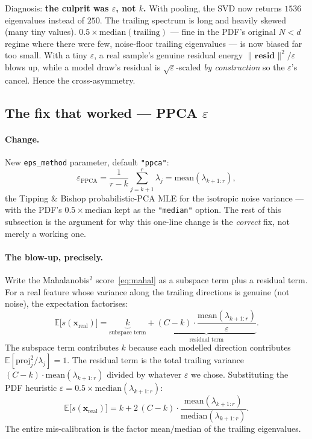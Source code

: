 \documentclass[11pt]{article}
\newcommand{\code}[1]{\texttt{#1}}
\begin{document}
Diagnosis: \textbf{the culprit was $\varepsilon$, not $k$.} With pooling, the SVD
now returns $1536$ eigenvalues instead of $250$. The trailing spectrum is long and
heavily skewed (many tiny values). $0.5 \times \mathrm{median}(\text{trailing})$
--- fine in the PDF's original $N < d$ regime where there were few, noise-floor
trailing eigenvalues --- is now biased far too small. With a tiny $\varepsilon$, a
real sample's genuine residual energy $\lVert\mathbf{resid}\rVert^2 / \varepsilon$
blows up, while a model draw's residual is $\sqrt{\varepsilon}$-scaled \emph{by
construction} so the $\varepsilon$'s cancel. Hence the cross-asymmetry.

\subsection{The fix that worked --- PPCA $\varepsilon$}
\label{sec:ppca}

\paragraph{Change.}
New \code{eps\_method} parameter, default \code{"ppca"}:
\begin{equation}
  \varepsilon_{\text{PPCA}} = \frac{1}{r-k}\sum_{j=k+1}^{r} \lambda_j
  = \mathrm{mean}(\lambda_{k+1:r}),
  \label{eq:ppca}
\end{equation}
the Tipping \& Bishop probabilistic-PCA MLE for the isotropic noise variance ---
with the PDF's $0.5 \times \mathrm{median}$ kept as the \code{"median"} option.
The rest of this subsection is the argument for why this one-line change is the
\emph{correct} fix, not merely a working one.

\paragraph{The blow-up, precisely.}
Write the Mahalanobis$^2$ score~\eqref{eq:mahal} as a subspace term plus a
residual term. For a real feature whose variance along the trailing directions is
genuine (not noise), the expectation factorises:
\begin{equation}
  \mathbb{E}\bigl[s(\mathbf{x}_{\text{real}})\bigr]
    = \underbrace{k}_{\text{subspace term}}
    + \underbrace{(C-k)\cdot
        \frac{\mathrm{mean}(\lambda_{k+1:r})}{\varepsilon}}_{\text{residual term}}.
  \label{eq:blowup}
\end{equation}
The subspace term contributes $k$ because each modelled direction contributes
$\mathbb{E}[\mathrm{proj}_j^2/\lambda_j] = 1$. The residual term is the total
trailing variance $(C-k)\cdot\mathrm{mean}(\lambda_{k+1:r})$ divided by whatever
$\varepsilon$ we chose. Substituting the PDF heuristic
$\varepsilon = 0.5 \times \mathrm{median}(\lambda_{k+1:r})$:
\begin{equation}
  \mathbb{E}\bigl[s(\mathbf{x}_{\text{real}})\bigr]
    = k + 2\,(C-k)\cdot
      \frac{\mathrm{mean}(\lambda_{k+1:r})}{\mathrm{median}(\lambda_{k+1:r})}.
  \label{eq:blowup-median}
\end{equation}
The entire mis-calibration is the factor
$\mathrm{mean}/\mathrm{median}$ of the trailing eigenvalues.
\end{document}
